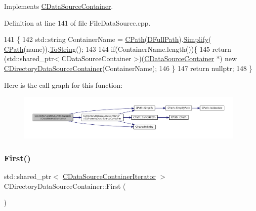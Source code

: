 Implements \hyperlink{classCDataSourceContainer_abebf1b9a6168b6783ee9753df612e511}{C\+Data\+Source\+Container}.



Definition at line 141 of file File\+Data\+Source.\+cpp.


\begin{DoxyCode}
141                                                                                                            
        \{
142     std::string ContainerName = \hyperlink{classCPath}{CPath}(\hyperlink{classCDirectoryDataSourceContainer_ac3d3c7e7d7bc9f68ba8a8747a3dee8b5}{DFullPath}).\hyperlink{classCPath_aa52dcb50c943a8abc8883db5ec43a45e}{Simplify}(
      \hyperlink{classCPath}{CPath}(name)).\hyperlink{classCPath_abbafaf377a7e38e0151bd9567d526951}{ToString}();
143     
144     \textcolor{keywordflow}{if}(ContainerName.length())\{
145         \textcolor{keywordflow}{return} (std::shared\_ptr< CDataSourceContainer >)(\hyperlink{classCDataSourceContainer}{CDataSourceContainer} *) \textcolor{keyword}{new} 
      \hyperlink{classCDirectoryDataSourceContainer_a62ef6d44201c6be66421b6c247f3b3bf}{CDirectoryDataSourceContainer}(ContainerName);
146     \}
147     \textcolor{keywordflow}{return} \textcolor{keyword}{nullptr};
148 \}
\end{DoxyCode}
Here is the call graph for this function\+:\nopagebreak
\begin{figure}[H]
\begin{center}
\leavevmode
\includegraphics[width=350pt]{classCDirectoryDataSourceContainer_a71291ab0a549056fc784f0c553a8dc39_cgraph}
\end{center}
\end{figure}
\hypertarget{classCDirectoryDataSourceContainer_a32aa8888dbf78f5a2a1ddb5324aad0cf}{}\label{classCDirectoryDataSourceContainer_a32aa8888dbf78f5a2a1ddb5324aad0cf} 
\subsubsection{\texorpdfstring{First()}{First()}}
{\footnotesize\ttfamily std\+::shared\+\_\+ptr$<$ \hyperlink{classCDataSourceContainerIterator}{C\+Data\+Source\+Container\+Iterator} $>$ C\+Directory\+Data\+Source\+Container\+::\+First (\begin{DoxyParamCaption}{ }\end{DoxyParamCaption})\hspace{0.3cm}{\ttfamily [virtual]}}



